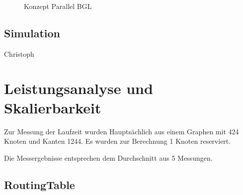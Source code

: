 \documentclass[paper=A4,pagesize=auto,12pt,headinclude=true,footinclude=true,BCOR=0mm,DIV=calc]{scrartcl}
\begin{document}
	\label{boost}
	\begin{figure}[H]
		\caption{Konzept Parallel BGL}
		\cite{ParallelBGLPicture}
	\end{figure}
	
	
	\subsection{Simulation}
		
		Christoph
	
	\section{Leistungsanalyse und Skalierbarkeit}
	Zur Messung der Laufzeit wurden Hauptsächlich aus einem Graphen mit 424 Knoten und Kanten 1244. Es wurden zur Berechnung 1 Knoten reserviert.
	
	Die Messergebnisse entsprechen dem Durchschnitt aus 5 Messungen.
	\subsection{RoutingTable}
\end{document}

